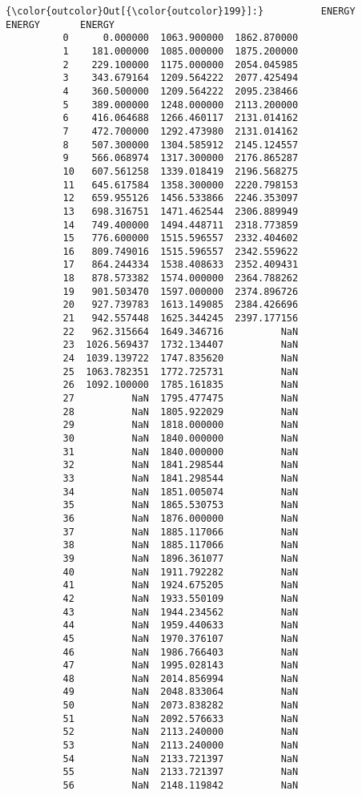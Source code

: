 \documentclass[11pt]{article}
\begin{document}
\begin{Verbatim}[commandchars=\\\{\}]
{\color{outcolor}Out[{\color{outcolor}199}]:}          ENERGY       ENERGY       ENERGY
          0      0.000000  1063.900000  1862.870000
          1    181.000000  1085.000000  1875.200000
          2    229.100000  1175.000000  2054.045985
          3    343.679164  1209.564222  2077.425494
          4    360.500000  1209.564222  2095.238466
          5    389.000000  1248.000000  2113.200000
          6    416.064688  1266.460117  2131.014162
          7    472.700000  1292.473980  2131.014162
          8    507.300000  1304.585912  2145.124557
          9    566.068974  1317.300000  2176.865287
          10   607.561258  1339.018419  2196.568275
          11   645.617584  1358.300000  2220.798153
          12   659.955126  1456.533866  2246.353097
          13   698.316751  1471.462544  2306.889949
          14   749.400000  1494.448711  2318.773859
          15   776.600000  1515.596557  2332.404602
          16   809.749016  1515.596557  2342.559622
          17   864.244334  1538.408633  2352.409431
          18   878.573382  1574.000000  2364.788262
          19   901.503470  1597.000000  2374.896726
          20   927.739783  1613.149085  2384.426696
          21   942.557448  1625.344245  2397.177156
          22   962.315664  1649.346716          NaN
          23  1026.569437  1732.134407          NaN
          24  1039.139722  1747.835620          NaN
          25  1063.782351  1772.725731          NaN
          26  1092.100000  1785.161835          NaN
          27          NaN  1795.477475          NaN
          28          NaN  1805.922029          NaN
          29          NaN  1818.000000          NaN
          30          NaN  1840.000000          NaN
          31          NaN  1840.000000          NaN
          32          NaN  1841.298544          NaN
          33          NaN  1841.298544          NaN
          34          NaN  1851.005074          NaN
          35          NaN  1865.530753          NaN
          36          NaN  1876.000000          NaN
          37          NaN  1885.117066          NaN
          38          NaN  1885.117066          NaN
          39          NaN  1896.361077          NaN
          40          NaN  1911.792282          NaN
          41          NaN  1924.675205          NaN
          42          NaN  1933.550109          NaN
          43          NaN  1944.234562          NaN
          44          NaN  1959.440633          NaN
          45          NaN  1970.376107          NaN
          46          NaN  1986.766403          NaN
          47          NaN  1995.028143          NaN
          48          NaN  2014.856994          NaN
          49          NaN  2048.833064          NaN
          50          NaN  2073.838282          NaN
          51          NaN  2092.576633          NaN
          52          NaN  2113.240000          NaN
          53          NaN  2113.240000          NaN
          54          NaN  2133.721397          NaN
          55          NaN  2133.721397          NaN
          56          NaN  2148.119842          NaN
\end{Verbatim}
            
\end{document}
